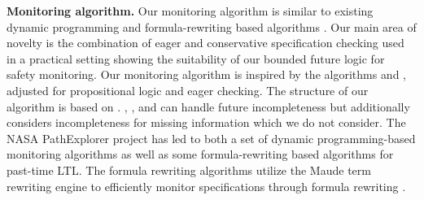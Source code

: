 
\vspace*{3pt}
\noindent
\textbf{Monitoring algorithm.}
Our monitoring algorithm is similar to existing dynamic programming and
formula-rewriting based algorithms \cite{Havelund2004,Havelund2002,Rosu2005,Thati2005,Basin2012}.
Our main area of novelty is the combination of eager and conservative specification checking used in a practical setting showing the suitability of our bounded future logic for safety monitoring.
Our monitoring algorithm is inspired by the algorithms \greduce \cite{Garg2011} and
\precis \cite{Chowdhury2014}, adjusted for propositional logic and eager checking.
The structure of our algorithm is based on \greduce.
\greduce, \precis, and \monitor can handle future incompleteness but \greduce additionally
considers incompleteness for missing information which we do not consider.
%
%
The NASA PathExplorer project has led to both a set of dynamic programming-based monitoring algorithms as
well as some formula-rewriting based algorithms \cite{Havelund2004} for past-time LTL.
The formula rewriting algorithms utilize the Maude term rewriting engine to efficiently monitor specifications
through formula rewriting \cite{Rosu2005}.
